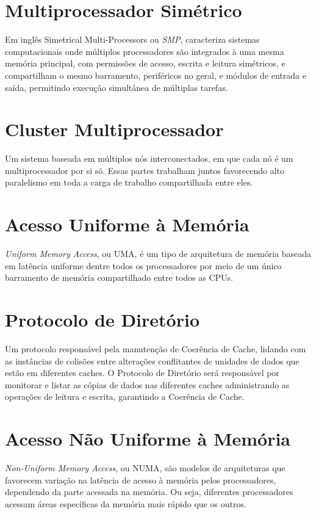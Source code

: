 \documentclass{article}
\begin{document}
\section*{Multiprocessador Simétrico}
Em inglês Simetrical Multi-Processors ou \emph{SMP}, caracteriza sistemas computacionais onde múltiplos processadores são integrados à uma mesma memória principal, com permissões de acesso, escrita e leitura simétricos, e compartilham o mesmo barramento, periféricos no geral, e módulos de entrada e saída, permitindo execução simultânea de múltiplas tarefas.

\section*{Cluster Multiprocessador}
Um sistema baseada em múltiplos nós interconectados, em que cada nó é um multiprocessador por si só. Essas partes trabalham juntos favorecendo alto paralelismo em toda a carga de trabalho compartilhada entre eles.

\section*{Acesso Uniforme à Memória}
\emph{Uniform Memory Access}, ou UMA, é um tipo de arquitetura de memória baseada em latência uniforme dentre todos os processadores por meio de um único barramento de memória compartilhado entre todos as CPUs.

\section*{Protocolo de Diretório}
Um protocolo responsável pela manutenção de Coerência de Cache, lidando com as instâncias de colisões entre alterações conflitantes de unidades de dados que estão em diferentes caches. O Protocolo de Diretório será responsável por monitorar e listar as cópias de dados nas diferentes caches administrando as operações de leitura e escrita, garantindo a Coerência de Cache.

\section*{Acesso Não Uniforme à Memória}
\emph{Non-Uniform Memory Access}, ou NUMA, são modelos de arquiteturas que favorecem variação na latência de acesso à memória pelos processadores, dependendo da parte acessada na memória. Ou seja, diferentes processadores acessam áreas específicas da memória mais rápido que os outros. 
 
\end{document}
